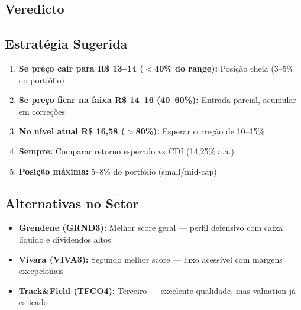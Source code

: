 \documentclass[12pt, a4paper]{article}
\begin{document}
\subsection{Veredicto}

\begin{center}
\end{center}

\subsection{Estratégia Sugerida}

\begin{enumerate}[leftmargin=*]
    \item \textbf{Se preço cair para R\$ 13--14 ($<$40\% do range):} Posição cheia (3--5\% do portfólio)
    \item \textbf{Se preço ficar na faixa R\$ 14--16 (40--60\%):} Entrada parcial, acumular em correções
    \item \textbf{No nível atual R\$ 16,58 ($>$80\%):} Esperar correção de 10--15\%
    \item \textbf{Sempre:} Comparar retorno esperado vs CDI (14,25\% a.a.)
    \item \textbf{Posição máxima:} 5--8\% do portfólio (small/mid-cap)
\end{enumerate}

\subsection{Alternativas no Setor}

\begin{itemize}[leftmargin=*]
    \item \textbf{Grendene (GRND3):} Melhor score geral --- perfil defensivo com caixa líquido e dividendos altos
    \item \textbf{Vivara (VIVA3):} Segundo melhor score --- luxo acessível com margens excepcionais
    \item \textbf{Track\&Field (TFCO4):} Terceiro --- excelente qualidade, mas valuation já esticado
\end{itemize}
\end{document}
